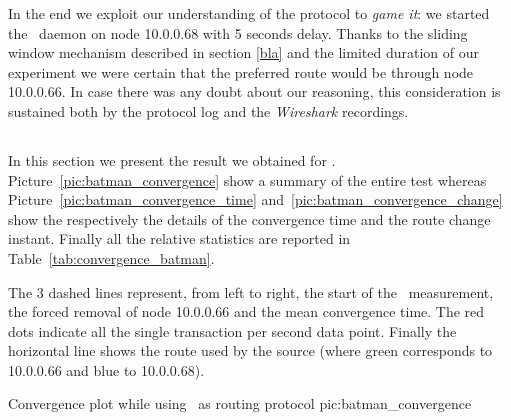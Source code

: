 In the end we exploit our understanding of the protocol to \emph{game
  it}: we started the \batman\ daemon on node 10.0.0.68 with 5 seconds
delay. Thanks to the sliding window mechanism described in section
\ref{bla} and the limited duration of our experiment we were certain
that the preferred route would be through node 10.0.0.66. In case
there was any doubt about our reasoning, this consideration is
sustained both by the protocol log and the \emph{Wireshark}
recordings.


\subsection{\batman}
In this section we present the result we obtained for
\batman. Picture~\ref{pic:batman_convergence} show a summary of the
entire test whereas Picture~\ref{pic:batman_convergence_time}
and~\ref{pic:batman_convergence_change} show the respectively the
details of the convergence time and the route change instant.
Finally all the relative statistics are reported in
Table~\ref{tab:convergence_batman}.

The 3 dashed lines represent, from left to right, the start of the
\netperf\ measurement, the forced removal of node 10.0.0.66 and the
mean convergence time. The red dots indicate all the single
transaction per second data point. Finally the horizontal line shows
the route used by the source (where green corresponds to 10.0.0.66 and
blue to 10.0.0.68).

               {\textwidth}
               {Convergence plot while using \batman\ as routing protocol}
               {pic:batman_convergence}


